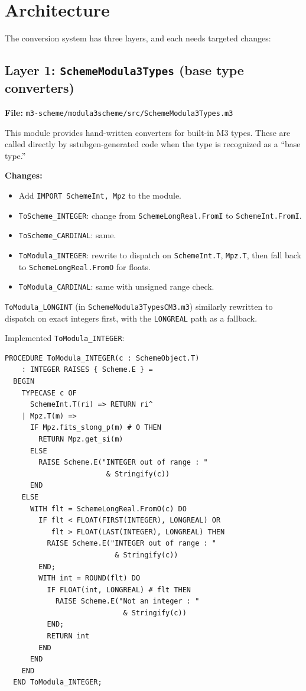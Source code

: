 \documentclass[11pt]{article}
\begin{document}
\section{Architecture}

The conversion system has three layers, and each needs targeted changes:

\subsection{Layer 1: \texttt{SchemeModula3Types} (base type converters)}

\textbf{File:} \texttt{m3-scheme/modula3scheme/src/SchemeModula3Types.m3}

This module provides hand-written converters for built-in M3 types.
These are called directly by sstubgen-generated code when the type is
recognized as a ``base type.''

\textbf{Changes:}
\begin{itemize}
\item Add \texttt{IMPORT SchemeInt, Mpz} to the module.
\item \texttt{ToScheme\_INTEGER}: change from \texttt{SchemeLongReal.FromI}
  to \texttt{SchemeInt.FromI}.
\item \texttt{ToScheme\_CARDINAL}: same.
\item \texttt{ToModula\_INTEGER}: rewrite to dispatch on
  \texttt{SchemeInt.T}, \texttt{Mpz.T}, then fall back to
  \texttt{SchemeLongReal.FromO} for floats.
\item \texttt{ToModula\_CARDINAL}: same with unsigned range check.
\end{itemize}

\texttt{ToModula\_LONGINT} (in \texttt{SchemeModula3TypesCM3.m3})
similarly rewritten to dispatch on exact integers first, with the
\texttt{LONGREAL} path as a fallback.

Implemented \texttt{ToModula\_INTEGER}:
\begin{lstlisting}
PROCEDURE ToModula_INTEGER(c : SchemeObject.T)
    : INTEGER RAISES { Scheme.E } =
  BEGIN
    TYPECASE c OF
      SchemeInt.T(ri) => RETURN ri^
    | Mpz.T(m) =>
      IF Mpz.fits_slong_p(m) # 0 THEN
        RETURN Mpz.get_si(m)
      ELSE
        RAISE Scheme.E("INTEGER out of range : "
                        & Stringify(c))
      END
    ELSE
      WITH flt = SchemeLongReal.FromO(c) DO
        IF flt < FLOAT(FIRST(INTEGER), LONGREAL) OR
           flt > FLOAT(LAST(INTEGER), LONGREAL) THEN
          RAISE Scheme.E("INTEGER out of range : "
                          & Stringify(c))
        END;
        WITH int = ROUND(flt) DO
          IF FLOAT(int, LONGREAL) # flt THEN
            RAISE Scheme.E("Not an integer : "
                            & Stringify(c))
          END;
          RETURN int
        END
      END
    END
  END ToModula_INTEGER;
\end{lstlisting}
\end{document}
